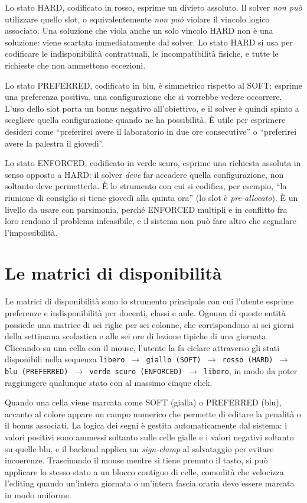 Lo stato HARD, codificato in rosso, esprime un divieto
assoluto. Il solver \emph{non pu\`o} utilizzare quello slot,
o equivalentemente \emph{non pu\`o} violare il vincolo
logico associato. Una soluzione che viola anche un solo
vincolo HARD non \`e una soluzione: viene scartata
immediatamente dal solver. Lo stato HARD si usa per
codificare le indisponibilit\`a contrattuali, le
incompatibilit\`a fisiche, e tutte le richieste che non
ammettono eccezioni.

Lo stato PREFERRED, codificato in blu, \`e simmetrico
rispetto al SOFT: esprime una preferenza positiva, una
configurazione che si vorrebbe vedere occorrere. L'uso
dello slot porta un bonus negativo all'obiettivo, e il
solver \`e quindi spinto a scegliere quella configurazione
quando ne ha possibilit\`a. \`E utile per esprimere
desideri come ``preferirei avere il laboratorio in due ore
consecutive'' o ``preferirei avere la palestra il
gioved\`i''.

Lo stato ENFORCED, codificato in verde scuro, esprime una
richiesta assoluta in senso opposto a HARD: il solver
\emph{deve} far accadere quella configurazione, non
soltanto deve permetterla. \`E lo strumento con cui si
codifica, per esempio, ``la riunione di consiglio si tiene
gioved\`i alla quinta ora'' (lo slot \`e
\emph{pre-allocato}). \`E un livello da usare con parsimonia,
perch\'e ENFORCED multipli e in conflitto fra loro rendono il
problema infeasibile, e il sistema non pu\`o fare altro che
segnalare l'impossibilit\`a.

\section{Le matrici di disponibilit\`a}

Le matrici di disponibilit\`a sono lo strumento principale
con cui l'utente esprime preferenze e indisponibilit\`a per
docenti, classi e aule. Ognuna di queste entit\`a possiede
una matrice di sei righe per sei colonne, che corrispondono
ai sei giorni della settimana scolastica e alle sei ore di
lezione tipiche di una giornata. Cliccando su una cella con
il mouse, l'utente la fa ciclare attraverso gli stati
disponibili nella sequenza \texttt{libero $\to$ giallo (SOFT)
$\to$ rosso (HARD) $\to$ blu (PREFERRED) $\to$ verde scuro
(ENFORCED) $\to$ libero}, in modo da poter raggiungere
qualunque stato con al massimo cinque click.

Quando una cella viene marcata come SOFT (gialla) o
PREFERRED (blu), accanto al colore appare un campo numerico
che permette di editare la penalit\`a o il bonus associati.
La logica dei segni \`e gestita automaticamente dal sistema:
i valori positivi sono ammessi soltanto sulle celle gialle e
i valori negativi soltanto su quelle blu, e il backend
applica un \emph{sign-clamp} al salvataggio per evitare
incoerenze. Trascinando il mouse mentre si tiene premuto il
tasto, si pu\`o applicare lo stesso stato a un blocco
contiguo di celle, comodit\`a che velocizza l'editing
quando un'intera giornata o un'intera fascia oraria deve
essere marcata in modo uniforme.

